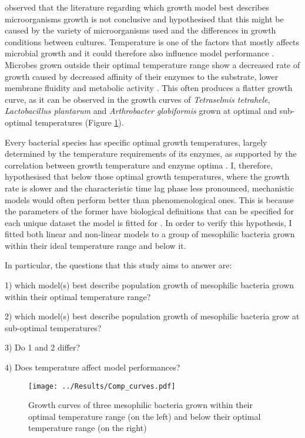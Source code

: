 \documentclass[a4paper]{article}
\begin{document}
\cite{pla2015comparison} observed that the literature regarding which growth model best describes microorganisms growth is not conclusive and hypothesised that this might be caused by the variety of microorganisms used and the differences in growth conditions between cultures. Temperature is one of the factors that mostly affects microbial growth and it could therefore also influence model performance \citep{Fujikawa2004ANL, doi:10.1080/10408398.2011.570463}. Microbes grown outside their optimal temperature range show a decreased rate of growth caused by decreased affinity of their enzymes to the substrate, lower membrane fluidity and metabolic activity \citep{10.1111/j.1574-6941.1999.tb00639.x, amato2009energy}. This often produces a flatter growth curve, as it can be observed in the growth curves of \textit{Tetraselmis tetrahele}, \textit{Lactobacillus plantarum} and \textit{Arthrobacter globiformis} grown at optimal and sub-optimal temperatures (Figure \ref{fig:growthcurves}).\par 

Every bacterial species has specific optimal growth temperatures, largely determined by the temperature requirements of its enzymes, as supported by the correlation between growth temperature and enzyme optima \citep{engqvist2018correlating}. I, therefore, hypothesised that below those optimal growth temperatures, where the growth rate is slower and the characteristic time lag phase less pronounced, mechanistic models would often perform better than phenomenological ones. This is because the parameters of the former have biological definitions that can be specified for each unique dataset the model is fitted for \citep{liberles2013need}. In order to verify this hypothesis, I fitted both linear and non-linear models to a group of mesophilic bacteria grown within their ideal temperature range and below it. \par
In particular, the questions that this study aims to answer are: \par
1) which model(s) best describe population growth of mesophilic bacteria grown within their optimal temperature range?
\par
2) which model(s) best describe population growth of mesophilic bacteria grow at sub-optimal temperatures?
\par
3) Do 1 and 2 differ? 
\par
4) Does temperature affect model performances?

\begin{figure}
    \centering
    \texttt{[image: ../Results/Comp\_curves.pdf]}
    \caption{Growth curves of three mesophilic bacteria grown within their optimal temperature range (on the left) and below their optimal temperature range (on the right)}
    \label{fig:growthcurves}
\end{figure}
\end{document}
